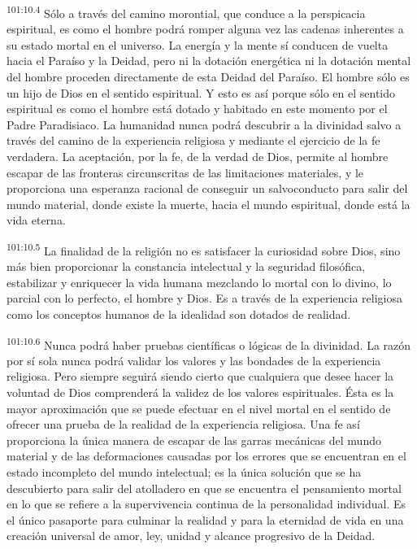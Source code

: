 \par
\textsuperscript{101:10.4} Sólo a través del camino morontial, que conduce a la perspicacia espiritual, es como el hombre podrá romper alguna vez las cadenas inherentes a su estado mortal en el universo. La energía y la mente sí conducen de vuelta hacia el Paraíso y la Deidad, pero ni la dotación energética ni la dotación mental del hombre proceden directamente de esta Deidad del Paraíso. El hombre sólo es un hijo de Dios en el sentido espiritual. Y esto es así porque sólo en el sentido espiritual es como el hombre está dotado y habitado en este momento por el Padre Paradisiaco. La humanidad nunca podrá descubrir a la divinidad salvo a través del camino de la experiencia religiosa y mediante el ejercicio de la fe verdadera. La aceptación, por la fe, de la verdad de Dios, permite al hombre escapar de las fronteras circunscritas de las limitaciones materiales, y le proporciona una esperanza racional de conseguir un salvoconducto para salir del mundo material, donde existe la muerte, hacia el mundo espiritual, donde está la vida eterna.

\par
\textsuperscript{101:10.5} La finalidad de la religión no es satisfacer la curiosidad sobre Dios, sino más bien proporcionar la constancia intelectual y la seguridad filosófica, estabilizar y enriquecer la vida humana mezclando lo mortal con lo divino, lo parcial con lo perfecto, el hombre y Dios. Es a través de la experiencia religiosa como los conceptos humanos de la idealidad son dotados de realidad.

\par
\textsuperscript{101:10.6} Nunca podrá haber pruebas científicas o lógicas de la divinidad. La razón por sí sola nunca podrá validar los valores y las bondades de la experiencia religiosa. Pero siempre seguirá siendo cierto que cualquiera que desee hacer la voluntad de Dios comprenderá la validez de los valores espirituales. Ésta es la mayor aproximación que se puede efectuar en el nivel mortal en el sentido de ofrecer una prueba de la realidad de la experiencia religiosa. Una fe así proporciona la única manera de escapar de las garras mecánicas del mundo material y de las deformaciones causadas por los errores que se encuentran en el estado incompleto del mundo intelectual; es la única solución que se ha descubierto para salir del atolladero en que se encuentra el pensamiento mortal en lo que se refiere a la supervivencia continua de la personalidad individual. Es el único pasaporte para culminar la realidad y para la eternidad de vida en una creación universal de amor, ley, unidad y alcance progresivo de la Deidad.

